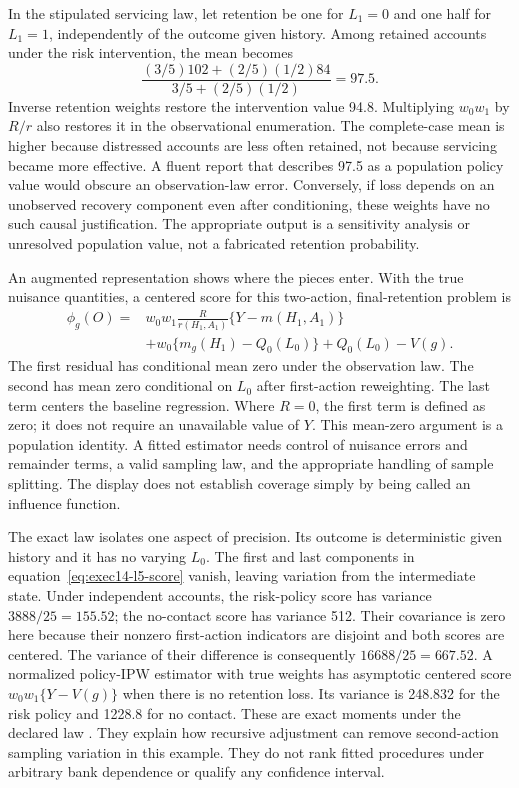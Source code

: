 In the stipulated servicing law, let retention be one for $L_1=0$ and one half
for $L_1=1$, independently of the outcome given history. Among retained accounts
under the risk intervention, the mean becomes
\[
 \frac{(3/5)102+(2/5)(1/2)84}{3/5+(2/5)(1/2)}=97.5.
\]
Inverse retention weights restore the intervention value 94.8. Multiplying
$w_0w_1$ by $R/r$ also restores it in the observational enumeration. The
complete-case mean is higher because distressed accounts are less often
retained, not because servicing became more effective. A fluent report that
describes 97.5 as a population policy value would obscure an observation-law
error. Conversely, if loss depends on an unobserved recovery component even
after conditioning, these weights have no such causal justification. The
appropriate output is a sensitivity analysis or unresolved population value,
not a fabricated retention probability.

An augmented representation shows where the pieces enter. With the true
nuisance quantities, a centered score for this two-action, final-retention
problem is
\begin{align}
 \phi_g(O)={}&w_0w_1\frac{R}{r(H_1,A_1)}
          \{Y-m(H_1,A_1)\}\nonumber\\
 &+w_0\{m_g(H_1)-Q_0(L_0)\}+Q_0(L_0)-V(g).
 \label{eq:exec14-l5-score}
\end{align}
The first residual has conditional mean zero under the observation law. The
second has mean zero conditional on $L_0$ after first-action reweighting.
The last term centers the baseline regression. Where $R=0$, the first term
is defined as zero; it does not require an unavailable value of $Y$. This
mean-zero argument is a population identity. A fitted estimator needs control
of nuisance errors and remainder terms, a valid sampling law, and the
appropriate handling of sample splitting. The display does not establish
coverage simply by being called an influence function.

The exact law isolates one aspect of precision. Its outcome is deterministic
given history and it has no varying $L_0$. The first and last components in
equation~\eqref{eq:exec14-l5-score} vanish, leaving variation from the intermediate
state. Under independent accounts, the risk-policy score has variance
$3888/25=155.52$; the no-contact score has variance 512. Their covariance is
zero here because their nonzero first-action indicators are disjoint and both
scores are centered. The variance of their difference is consequently
$16688/25=667.52$. A normalized policy-IPW estimator with true weights has
asymptotic centered score $w_0w_1\{Y-V(g)\}$ when there is no retention loss.
Its variance is 248.832 for the risk policy and 1228.8 for no contact.
These are exact moments under the declared law
\citep{exec14_workflow_oracle}. They explain how recursive adjustment can remove
second-action sampling variation in this example. They do not rank fitted
procedures under arbitrary bank dependence or qualify any confidence interval.

